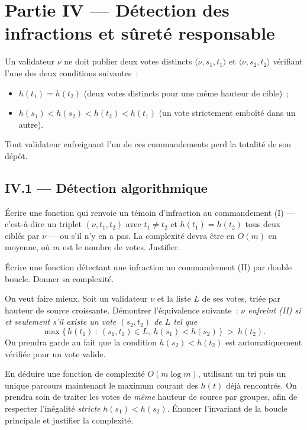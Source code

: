 \documentclass[11pt,a4paper]{article}
\begin{document}
\section*{Partie IV --- Détection des infractions et sûreté responsable}

\begin{defi}
Un validateur $\nu$ ne doit publier deux votes distincts $\langle\nu,s_1,t_1\rangle$ et
$\langle\nu,s_2,t_2\rangle$ vérifiant l'une des deux conditions suivantes~:
\begin{itemize}[leftmargin=2.2em,itemsep=1pt]
\item[\textbf{(I)}] $h(t_1)=h(t_2)$ \quad (deux votes distincts pour une même hauteur de
cible)~;
\item[\textbf{(II)}] $h(s_1)<h(s_2)<h(t_2)<h(t_1)$ \quad (un vote strictement emboîté dans
un autre).
\end{itemize}
Tout validateur enfreignant l'un de ces commandements perd la totalité de son dépôt.
\end{defi}

\subsection*{IV.1 --- Détection algorithmique}

\Q Écrire une fonction  qui renvoie un témoin d'infraction au
commandement (I) — c'est-à-dire un triplet $(\nu, t_1, t_2)$ avec $t_1\ne t_2$ et
$h(t_1)=h(t_2)$ tous deux ciblés par $\nu$ — ou  s'il n'y en a pas. La complexité
devra être en $O(m)$ en moyenne, où $m$ est le nombre de votes. Justifier.

\Q Écrire une fonction  détectant une infraction au
commandement (II) par double boucle. Donner sa complexité.

\Q On veut faire mieux. Soit un validateur $\nu$ et la liste $L$ de ses votes, triée par
hauteur de source croissante. Démontrer l'équivalence suivante~: \emph{$\nu$ enfreint (II)
si et seulement s'il existe un vote $(s_2,t_2)$ de $L$ tel que
\[ \max\{\,h(t_1)\ :\ (s_1,t_1)\in L,\ h(s_1)<h(s_2)\,\}\ >\ h(t_2). \]}
On prendra garde au fait que la condition $h(s_2)<h(t_2)$ est automatiquement vérifiée pour
un vote valide.

\Q En déduire une fonction  de complexité $O(m\log m)$,
utilisant un tri puis un unique parcours maintenant le maximum courant des $h(t)$ déjà
rencontrés. On prendra soin de traiter les votes de \emph{même} hauteur de source par
groupes, afin de respecter l'inégalité \emph{stricte} $h(s_1)<h(s_2)$. Énoncer l'invariant
de la boucle principale et justifier la complexité.
\end{document}
